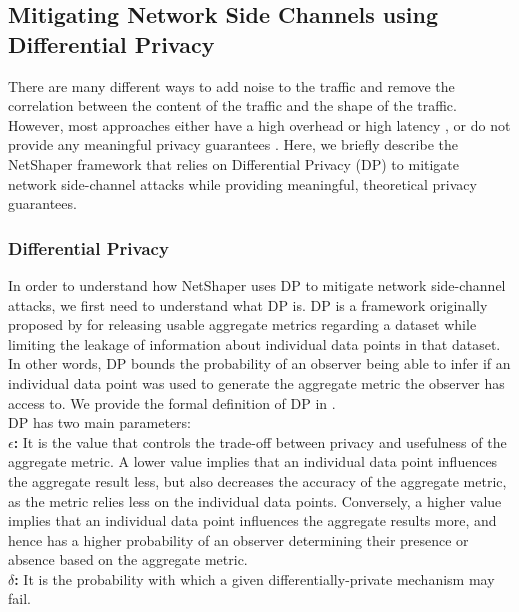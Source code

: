 \subsection{Mitigating Network Side Channels using Differential Privacy}
\label{subsec:netshaper-background-framework}

There are many different ways to add noise to the traffic and remove the correlation between the content of the traffic and the shape of the traffic.
However, most approaches either have a high overhead or high latency \cite{cai2014csbuflo, mehta2022pacer}, or do not provide any meaningful privacy guarantees \cite{hou2020wf, nasr2021blind, rahman2020mockingbird, shan2021dolos, wang2017walkie, wright2009traffic}.
Here, we briefly describe the NetShaper framework that relies on Differential Privacy (DP) to mitigate network side-channel attacks while providing meaningful, theoretical privacy guarantees.

\subsubsection{Differential Privacy}
\label{subsubsec:netshaper-background-framework-dp}
In order to understand how NetShaper uses DP to mitigate network side-channel attacks, we first need to understand what DP is.
DP is a framework originally proposed by \citet{dwork2006differential} for releasing usable aggregate metrics regarding a dataset while limiting the leakage of information about individual data points in that dataset.
In other words, DP bounds the probability of an observer being able to infer if an individual data point was used to generate the aggregate metric the observer has access to.
We provide the formal definition of DP in . \\
DP has two main parameters: \\
\textbf{$\epsilon$: } It is the value that controls the trade-off between privacy and usefulness of the aggregate metric.
A lower value implies that an individual data point influences the aggregate result less, but also decreases the accuracy of the aggregate metric, as the metric relies less on the individual data points.
Conversely, a higher value implies that an individual data point influences the aggregate results more, and hence has a higher probability of an observer determining their presence or absence based on the aggregate metric.\\
\textbf{$\delta$: } It is the probability with which a given differentially-private mechanism may fail.

